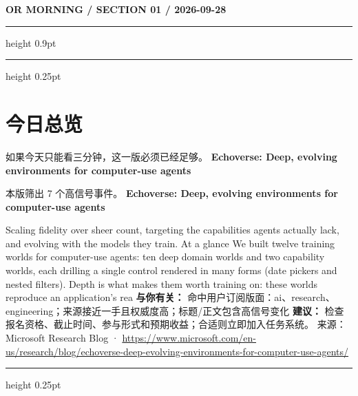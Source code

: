 \documentclass[10.5pt]{ctexart}
\begin{document}
{\small\bfseries OR MORNING / SECTION 01 / 2026-09-28}
\vspace{2mm}
\hrule height 0.9pt
\vspace{1.5mm}
\hrule height 0.25pt
\vspace{4mm}
\section*{今日总览}
{\color{ormuted} 如果今天只能看三分钟，这一版必须已经足够。}
\vspace{2mm}
{\fontsize{25}{29}\selectfont\bfseries Echoverse: Deep, evolving environments for computer-use agents}\par
\vspace{2mm}
{\large 本版筛出 7 个高信号事件。}
\vspace{3mm}
{\Large\bfseries Echoverse: Deep, evolving environments for computer-use agents}\par
Scaling fidelity over sheer count, targeting the capabilities agents actually lack, and evolving with the models they train. At a glance We built twelve training worlds for computer-use agents: ten deep domain worlds and two capability worlds, each drilling a single control rendered in many forms (date pickers and nested filters). Depth is what makes them worth training on: these worlds reproduce an application’s rea
\textbf{与你有关：} 命中用户订阅版面：ai、research、engineering；来源接近一手且权威度高；标题/正文包含高信号变化
\textbf{建议：} 检查报名资格、截止时间、参与形式和预期收益；合适则立即加入任务系统。
{\footnotesize\color{ormuted} 来源：Microsoft Research Blog · \url{https://www.microsoft.com/en-us/research/blog/echoverse-deep-evolving-environments-for-computer-use-agents/}}
\vspace{3mm}
\hrule height 0.25pt
\vspace{3mm}
\end{document}
